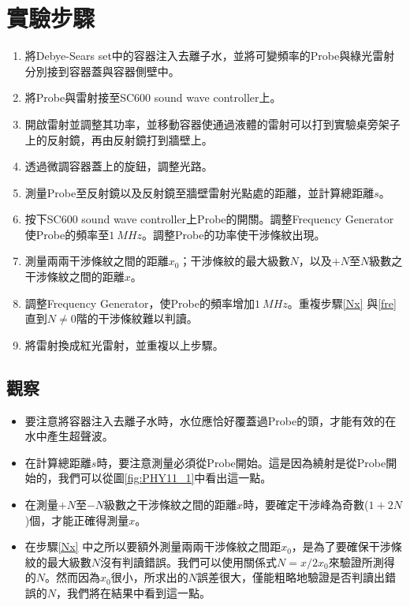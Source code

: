 \documentclass[12pt]{report}
\begin{document}
\section{實驗步驟}
\begin{enumerate}
    \item 將Debye-Sears set中的容器注入去離子水，並將可變頻率的Probe與綠光雷射分別接到容器蓋與容器側壁中。
    \item 將Probe與雷射接至SC600 sound wave controller上。
    \item 開啟雷射並調整其功率，並移動容器使通過液體的雷射可以打到實驗桌旁架子上的反射鏡，再由反射鏡打到牆壁上。
    \item 透過微調容器蓋上的旋鈕，調整光路。
    \item 測量Probe至反射鏡以及反射鏡至牆壁雷射光點處的距離，並計算總距離$s$。
    \item 按下SC600 sound wave controller上Probe的開關。調整Frequency Generator使Probe的頻率至$\SI{1}{MHz}$。調整Probe的功率使干涉條紋出現。
    \item \label{Nx}測量兩兩干涉條紋之間的距離$x_0$；干涉條紋的最大級數$N$，以及$+N$至$N$級數之干涉條紋之間的距離$x$。
    \item \label{fre}調整Frequency Generator，使Probe的頻率增加$\SI{1}{MHz}$。重複步驟\ref{Nx} 與\ref{fre} 直到$N\neq 0$階的干涉條紋難以判讀。
    \item 將雷射換成紅光雷射，並重複以上步驟。
    
\end{enumerate}
\subsection*{觀察}
\begin{itemize}
    \item 要注意將容器注入去離子水時，水位應恰好覆蓋過Probe的頭，才能有效的在水中產生超聲波。
    \item 在計算總距離$s$時，要注意測量必須從Probe開始。這是因為繞射是從Probe開始的，我們可以從圖\ref{fig:PHY11_1}中看出這一點。
    \item 在測量$+N$至$-N$級數之干涉條紋之間的距離$x$時，要確定干涉峰為奇數($1+2N$)個，才能正確得測量$x$。
    \item 在步驟\ref{Nx} 中之所以要額外測量兩兩干涉條紋之間距$x_0$，是為了要確保干涉條紋的最大級數$N$沒有判讀錯誤。我們可以使用關係式$N=x/2x_0$來驗證所測得的$N$。然而因為$x_0$很小，所求出的$N$誤差很大，僅能粗略地驗證是否判讀出錯誤的$N$，我們將在結果中看到這一點。
    
\end{itemize}
\end{document}
